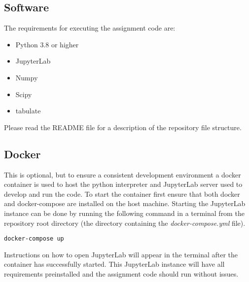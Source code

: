     \newpage

    \begin{appendices}
        \section{Software}
        The requirements for executing the assignment code are:
        \begin{itemize}
            \item Python 3.8 or higher
            \item JupyterLab
            \item Numpy
            \item Scipy
            \item tabulate
        \end{itemize}

        Please read the README file for a description of the repository file structure.
        
        \subsection{Docker}
        This is optional, but to ensure a consistent development environment a docker container is used to host the python interpreter and JupyterLab server used to develop and run the code. To start the container first ensure that both docker and docker-compose are installed on the host machine. Starting the JupyterLab instance can be done by running the following command in a terminal from the repository root directory (the directory containing the \emph{docker-compose.yml} file).

        \texttt{docker-compose up}

        Instructions on how to open JupyterLab will appear in the terminal after the container has successfully started. This JupyterLab instance will have all requirements preinstalled and the assignment code should run without issues.        

    \end{appendices}


    \printbibliography

